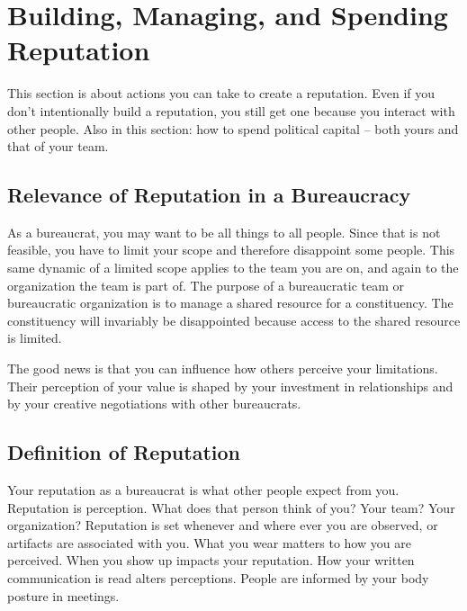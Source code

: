 \section{Building, Managing, and Spending Reputation\label{sec:reputation}}




This section is about actions you can take to create a reputation. Even if you don't intentionally build a reputation, you still get one because you interact with other people. Also in this section: how to spend political capital -- both yours and that of your team. 

\subsection*{Relevance of Reputation in a Bureaucracy}

As a bureaucrat, you may want to be all things to all people. Since that is not feasible, you have to limit your scope and therefore disappoint some people. This same dynamic of a limited scope applies to the team you are on, and again to the organization the team is part of. The purpose of a bureaucratic team or bureaucratic organization is to manage a \gls{shared resource} for a constituency. The constituency will invariably be disappointed because access to the shared resource is limited. 

The good news is that you can influence how others perceive your limitations. Their perception of your value is shaped by your investment in relationships and by your creative negotiations with other bureaucrats. %

\subsection*{Definition of Reputation}

Your \gls{reputation} as a bureaucrat is what other people expect from you. \iftoggle{glossaryinmargin}{\marginpar{[Glossary]}}{}
Reputation is perception. What does that person think of you? Your team? Your organization? 
Reputation is set whenever and where ever you are observed, or artifacts are associated with you. 
What you wear matters to how you are perceived. When you show up impacts your reputation. How your written communication is read alters perceptions. People are informed by your body posture in meetings. 

